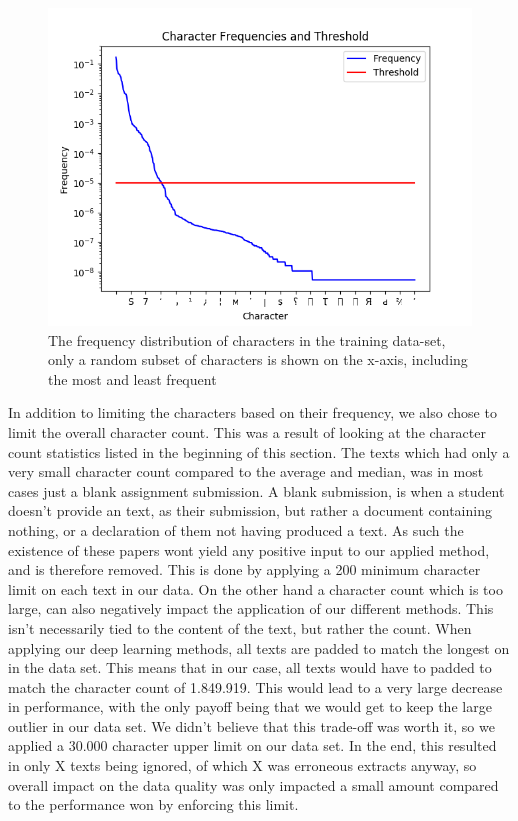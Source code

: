\begin{figure}[htb]
    \centering
    \includegraphics[scale=.8]{./graphs/data/character_frequencies.png}
    \caption{The frequency distribution of characters in the training data-set,
        only a random subset of characters is shown on the x-axis, including the
        most and least frequent}
    \label{fig:character_frequencies}
\end{figure}

In addition to limiting the characters based on their frequency, we also chose
to limit the overall character count. This was a result of looking at the
character count statistics listed in the beginning of this section. The texts
which had only a very small character count compared to the average and median,
was in most cases just a blank assignment submission. A blank submission, is
when a student doesn't provide an text, as their submission, but rather a
document containing nothing, or a declaration of them not having produced a
text. As such the existence of these papers wont yield any positive input to our
applied method, and is therefore removed. This is done by applying a 200 minimum
character limit on each text in our data. On the other hand a character count
which is too large, can also negatively impact the application of our different
methods. This isn't necessarily tied to the content of the text, but rather the
count. When applying our deep learning methods, all texts are padded to match
the longest on in the data set. This means that in our case, all texts would
have to padded to match the character count of 1.849.919. This would lead to a
very large decrease in performance, with the only payoff being that we would get
to keep the large outlier in our data set. We didn't believe that this trade-off
was worth it, so we applied a 30.000 character upper limit on our data set. In
the end, this resulted in only X texts being ignored, of which X was erroneous
extracts anyway, so overall impact on the data quality was only impacted a small
amount compared to the performance won by enforcing this limit.

